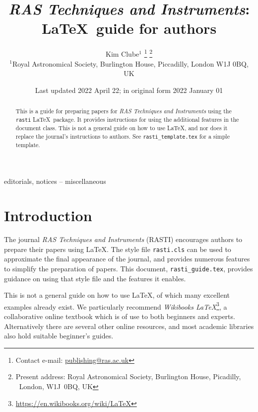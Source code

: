 \documentclass[fleqn,usenatbib,useAMS]{rasti}
\title[RASTI \LaTeX\ guide for authors]{\textit{RAS Techniques and Instruments}:  \LaTeX\ guide for authors}
\author[K. Clube]{Kim Clube$^{1}$%
\thanks{Contact e-mail: \href{mailto:publishing@ras.ac.uk}{publishing@ras.ac.uk}}%
\thanks{Present address: Royal Astronomical Society, Burlington House, Picadilly, \mbox{}~London, W1J~0BQ, UK}%
\\
$^{1}$Royal Astronomical Society, Burlington House, Piccadilly, London W1J 0BQ, UK}
\date{Last updated 2022 April 22; in original form 2022 January 01}
\begin{document}
\label{firstpage}
\pagerange{\pageref{firstpage}--\pageref{lastpage}}
\maketitle

\begin{abstract}
This is a guide for preparing papers for \textit{RAS Techniques and Instruments} using the \verb'rasti' \LaTeX\ package.
It provides instructions for using the additional features in the document class.
This is not a general guide on how to use \LaTeX, and nor does it replace the journal's instructions to authors.
See \texttt{rasti\_template.tex} for a simple template.
\end{abstract}

\begin{keywords}
editorials, notices -- miscellaneous
\end{keywords}



\begingroup
\let\clearpage\relax
\tableofcontents
\endgroup
\newpage

\section{Introduction}

The journal \textit{RAS Techniques and Instruments} (RASTI) encourages authors to prepare their papers using \LaTeX.
The style file \verb'rasti.cls' can be used to approximate the final appearance of the journal, and provides numerous features to simplify the preparation of papers.
This document, \verb'rasti_guide.tex', provides guidance on using that style file and the features it enables.

This is not a general guide on how to use \LaTeX, of which many excellent examples already exist.
We particularly recommend \textit{Wikibooks \LaTeX}\footnote{\url{https://en.wikibooks.org/wiki/LaTeX}}, a collaborative online textbook which is of use to both beginners and experts.
Alternatively there are several other online resources, and most academic libraries also hold suitable beginner's guides.
\end{document}
